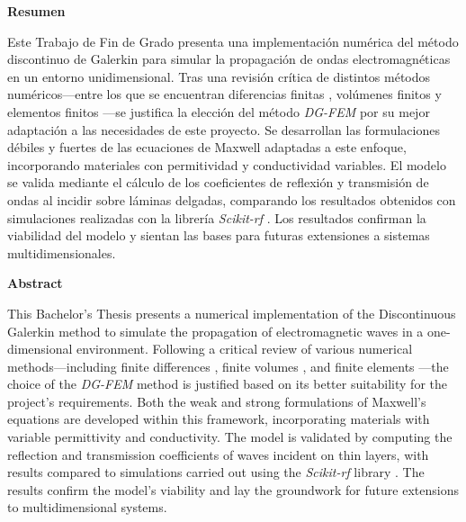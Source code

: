 \documentclass[11pt,a4paper,twoside,pdf]{article}
\numberwithin{equation}{section}
\begin{document}
\begin{center}
{\bf Resumen}
\bigskip

\begin{minipage}{0.8\linewidth}
Este Trabajo de Fin de Grado presenta una implementación numérica del método discontinuo de Galerkin \cite{abstract1} para simular la propagación de ondas electromagnéticas en un entorno unidimensional. Tras una revisión crítica de distintos métodos numéricos—entre los que se encuentran diferencias finitas \cite{abstract2}, volúmenes finitos \cite{abstract3} y elementos finitos \cite{abstract4}—se justifica la elección del método \textit{DG-FEM} por su mejor adaptación a las necesidades de este proyecto. Se desarrollan las formulaciones débiles y fuertes de las ecuaciones de Maxwell adaptadas a este enfoque, incorporando materiales con permitividad y conductividad variables. El modelo se valida mediante el cálculo de los coeficientes de reflexión y transmisión de ondas al incidir sobre láminas delgadas, comparando los resultados obtenidos con simulaciones realizadas con la librería \textit{Scikit-rf} \cite{scikit}. Los resultados confirman la viabilidad del modelo y sientan las bases para futuras extensiones a sistemas multidimensionales.
\end{minipage}

\vfill

{\bf Abstract} 
\bigskip

\begin{minipage}{0.8\linewidth}
This Bachelor's Thesis presents a numerical implementation of the Discontinuous Galerkin method \cite{abstract1} to simulate the propagation of electromagnetic waves in a one-dimensional environment. Following a critical review of various numerical methods—including finite differences \cite{abstract2}, finite volumes \cite{abstract3}, and finite elements \cite{abstract4}—the choice of the \textit{DG-FEM} method is justified based on its better suitability for the project's requirements. Both the weak and strong formulations of Maxwell’s equations are developed within this framework, incorporating materials with variable permittivity and conductivity. The model is validated by computing the reflection and transmission coefficients of waves incident on thin layers, with results compared to simulations carried out using the \textit{Scikit-rf} library \cite{scikit}. The results confirm the model’s viability and lay the groundwork for future extensions to multidimensional systems.
\end{minipage}

\vfill

\end{center}
\newpage
\end{document}
